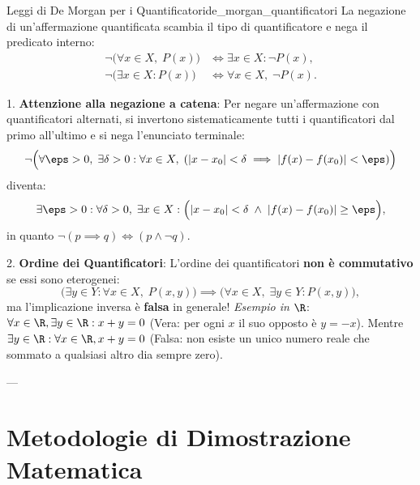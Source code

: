 \begin{teorema}{Leggi di De Morgan per i Quantificatori}{de_morgan_quantificatori}
La negazione di un'affermazione quantificata scambia il tipo di quantificatore e nega il predicato interno:
\begin{align}
    \neg \Big(\forall x \in X, \; P(x)\Big) &\iff \exists x \in X : \neg P(x), \label{eq:demorgan_univ} \\
    \neg \Big(\exists x \in X : P(x)\Big) &\iff \forall x \in X, \; \neg P(x). \label{eq:demorgan_esiste}
\end{align}
\end{teorema}

\begin{esame}
1. \textbf{Attenzione alla negazione a catena}:
Per negare un'affermazione con quantificatori alternati, si invertono sistematicamente tutti i quantificatori dal primo all'ultimo e si nega l'enunciato terminale:
\begin{equation}
    \neg \Big(\forall \eps > 0, \; \exists \delta > 0 : \forall x \in X, \; (|x - x_0| < \delta \implies |f(x) - f(x_0)| < \eps)\Big)
\end{equation}
diventa:
\begin{equation}
    \exists \eps > 0 : \forall \delta > 0, \; \exists x \in X : \Big(|x - x_0| < \delta \;\land\; |f(x) - f(x_0)| \ge \eps\Big),
\end{equation}
in quanto $\neg(p \implies q) \iff (p \land \neg q)$.

2. \textbf{Ordine dei Quantificatori}:
L'ordine dei quantificatori \textbf{non è commutativo} se essi sono eterogenei:
\begin{equation}
    \Big(\exists y \in Y : \forall x \in X, \; P(x, y)\Big) \implies \Big(\forall x \in X, \; \exists y \in Y : P(x, y)\Big),
\end{equation}
ma l'implicazione inversa è \textbf{falsa} in generale!
\emph{Esempio in $\R$}: $\forall x \in \R, \exists y \in \R : x + y = 0$ (Vera: per ogni $x$ il suo opposto è $y = -x$).
Mentre $\exists y \in \R : \forall x \in \R, x + y = 0$ (Falsa: non esiste un unico numero reale che sommato a qualsiasi altro dia sempre zero).
\end{esame}

---

\section{Metodologie di Dimostrazione Matematica}

